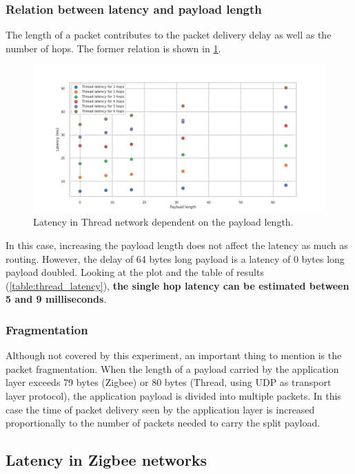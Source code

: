 \subsubsection*{Relation between latency and payload length}
The length of a packet contributes to the packet delivery delay 
as well as the number of hops. The former relation is shown
in \ref{fig:thread_latency_length}.

\begin{figure}[H]
    \centering
    \includegraphics[scale=0.45]{images/Thread_Latency_vs_length.png}
    \caption{Latency in Thread network dependent on the payload length. }
    \label{fig:thread_latency_length}
\end{figure}

In this case, 
increasing the payload length does not affect the latency as much
as routing. However, the delay of 64 bytes long payload is a 
latency of 0 bytes long payload doubled. Looking at the plot and
the table of results (\ref{table:thread_latency}), \textbf{the 
single hop latency can be estimated between 5 and 9 
milliseconds}.

\subsubsection*{Fragmentation}

Although not covered by this experiment, an important thing to mention is the packet fragmentation. When the length of a payload
carried by the application layer exceeds 79 bytes (Zigbee) or 80 
bytes (Thread, using UDP as transport layer protocol), the 
application payload is divided into multiple packets. In this case 
the time of packet delivery seen by the application layer is 
increased proportionally to the number of packets needed to carry the split payload.


\subsection{Latency in Zigbee networks}

